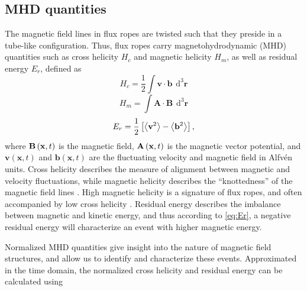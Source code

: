 \subsection{MHD quantities}
The magnetic field lines in flux ropes are twisted such that they preside in a tube-like configuration. Thus, flux ropes carry magnetohydrodynamic (MHD) quantities such as cross helicity $H_c$ and magnetic helicity $H_m$, as well as residual energy $E_r$, defined as
\begin{equation}
    H_c = \frac{1}{2}\int \mathbf{v}\cdot\mathbf{b} \hspace{5pt} \mathrm{d^3} \mathbf{r}
    \label{eq:Hc}
\end{equation}
\begin{equation}
    H_m = \int \mathbf{A}\cdot\mathbf{B} \hspace{5pt} \mathrm{d^3} \mathbf{r}
    \label{eq:Hm}
\end{equation}
\begin{equation}
    E_r = \frac{1}{2} \left[ \left \langle \mathbf{v}^2 \right\rangle  - \left \langle \mathbf{b}^2 \right\rangle \right],
    \label{eq:Er}
\end{equation}
where $\mathbf{B}\left( \mathbf{x},t \right)$ is the magnetic field, $\mathbf{A}\left( \mathbf{x},t \right)$ is the magnetic vector potential, and $\mathbf{v}(\mathbf{x},t)$ and $\mathbf{b}(\mathbf{x},t)$ are the fluctuating velocity and magnetic field in Alfv\'en units. Cross helicity describes the measure of alignment between magnetic and velocity fluctuations, while magnetic helicity describes the “knottedness” of the magnetic field lines \cite{Matthaeus:1982}. High magnetic helicity is a signature of flux ropes, and often accompanied by low cross helicity \cite{Zhao:2020}. Residual energy describes the imbalance between magnetic and kinetic energy, and thus according to \eqref{eq:Er}, a negative residual energy will characterize an event with higher magnetic energy.

Normalized MHD quantities give insight into the nature of magnetic field structures, and allow us to identify and characterize these events. Approximated in the time domain, the normalized cross helicity and residual energy can be calculated using

